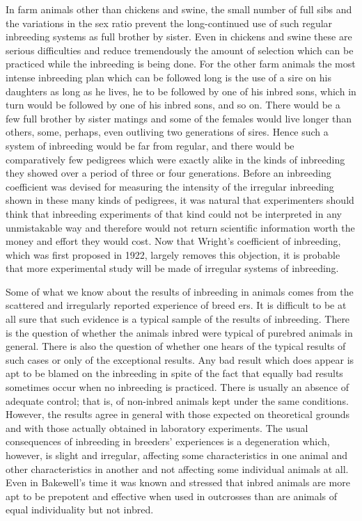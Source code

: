 In farm animals other than chickens and swine, the small number of
full sibs and the variations in the sex ratio prevent the long-continued
use of such regular inbreeding systems as full brother by sister. Even in
chickens and swine these are serious difficulties and reduce tremendously
the amount of selection which can be practiced while the inbreeding
is being done. For the other farm animals the most intense inbreeding
plan which can be followed long is the use of a sire on his daughters as
long as he lives, he to be followed by one of his inbred sons, which in
turn would be followed by one of his inbred sons, and so on. There
would be a few full brother by sister matings and some of the females
would live longer than others, some, perhaps, even outliving two generations
of sires. Hence such a system of inbreeding would be far from
regular, and there would be comparatively few pedigrees which were
exactly alike in the kinds of inbreeding they showed over a period of
three or four generations. Before an inbreeding coefficient was devised
for measuring the intensity of the irregular inbreeding shown in these
many kinds of pedigrees, it was natural that experimenters should think
that inbreeding experiments of that kind could not be interpreted in
any unmistakable way and therefore would not return scientific information
worth the money and effort they would cost. Now that Wright's
coefficient of inbreeding, which was first proposed in 1922, largely
removes this objection, it is probable that more experimental study will
be made of irregular systems of inbreeding.

Some of what we know about the results of inbreeding in animals
comes from the scattered and irregularly reported experience of breed ers.
It is difficult to be at all sure that such evidence is a typical sample
of the results of inbreeding. There is the question of whether the animals
inbred were typical of purebred animals in general. There is also
the question of whether one hears of the typical results of such cases or
only of the exceptional results. Any bad result which does appear is apt
to be blamed on the inbreeding in spite of the fact that equally bad
results sometimes occur when no inbreeding is practiced. There is
usually an absence of adequate control; that is, of non-inbred animals
kept under the same conditions. However, the results agree in general
with those expected on theoretical grounds and with those actually
obtained in laboratory experiments. The usual consequences of
inbreeding in breeders' experiences is a degeneration which, however,
is slight and irregular, affecting some characteristics in one animal and
other characteristics in another and not affecting some individual animals
at all. Even in Bakewell's time it was known and stressed that
inbred animals are more apt to be prepotent and effective when used in
outcrosses than are animals of equal individuality but not inbred.

